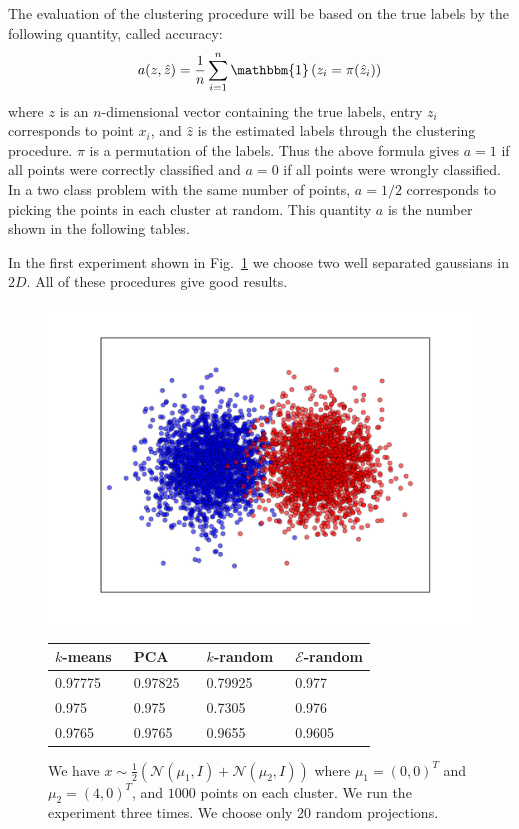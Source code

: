\documentclass[aps,preprint,nofootinbib,floatfix]{revtex4-1}
\begin{document}
The evaluation of the clustering procedure 
will be based on the true labels by the following quantity, called
accuracy:
\begin{equation}
\label{eq:accuracy}
a(z,\hat{z}) = 
\dfrac{1}{n}\sum_{i=1}^{n} \mathbbm{1}\left(z_i = \pi(\hat{z}_i) \right)
\end{equation}
where $z$ is an $n$-dimensional vector containing the true labels, entry
$z_i$ corresponds to point $x_i$, and $\hat{z}$ is the estimated labels
through the clustering procedure. $\pi$ is a permutation of the labels.
Thus the above formula gives $a=1$ if all points were correctly classified and
$a=0$ if all points were wrongly classified. In a two class problem with
the same number of points, $a=1/2$ corresponds to picking the points in each
cluster at random. 
This quantity $a$ is the number shown in the following tables.


In the first experiment shown in Fig.~\ref{fig:2d_gauss_sep} we choose
two well separated gaussians in $2D$. All of these procedures give good
results.

\begin{figure}
\begin{minipage}{.49\textwidth}
\includegraphics[scale=.45]{2d_gauss_separate.pdf}
\end{minipage}
\begin{minipage}{.49\textwidth}
\begin{tabular}{ l  l  l l}
\hline
$k$-means~ & PCA~~~ & $k$-random~ & $\mathcal{E}$-random \\
\hline
0.97775 &
0.97825 & 
0.79925 &
0.977 \\
0.975 &
0.975 &
0.7305 &
0.976 \\
0.9765 &
0.9765 &
0.9655 &
0.9605 \\
%
\hline
\end{tabular}
\end{minipage}
\caption{\label{fig:2d_gauss_sep}
We have $x \sim \tfrac{1}{2}\left( \mathcal{N}(\mu_1, I) +
\mathcal{N}(\mu_2, I)\right)$ where $\mu_1 = (0,0)^T$ and $\mu_2=(4,0)^T$,
and $1000$ points on each cluster. We run the experiment three times.
We choose only $20$ random projections.
}
\end{figure}
\end{document}

